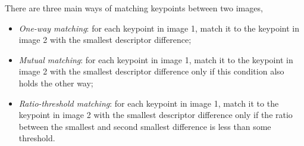 There are three main ways of matching keypoints between two images,
\begin{itemize}
  \item \textit{One-way matching}: for each keypoint in image 1, match it to the
    keypoint in image 2 with the smallest descriptor difference;
  \item \textit{Mutual matching}: for each keypoint in image 1, match it to the
    keypoint in image 2 with the smallest descriptor difference only if this condition
    also holds the other way;
  \item \textit{Ratio-threshold matching}: for each keypoint in image 1, match
    it to the keypoint in image 2 with the smallest descriptor difference only
    if the ratio between the smallest and second smallest difference is less
    than some threshold.
\end{itemize}

